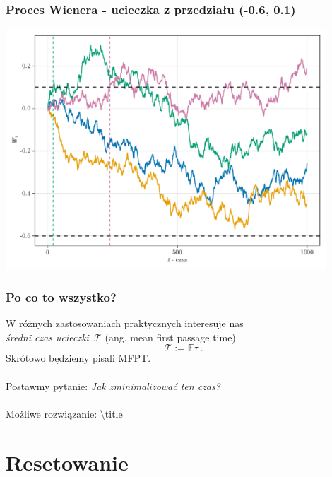 \documentclass{beamer}
\newcommand{\E}{\mathbb{E}}
\newcommand{\1}{\mathbb{1}}
\newcommand{\T}{\mathcal{T}}
\begin{document}
\begin{frame}
\frametitle{Proces Wienera - ucieczka z przedziału (-0.6, 0.1)}
\includegraphics[width=0.9\textwidth]{wiener-sim/tr-with-bounds.pdf}
\end{frame}

\begin{frame}
\frametitle{Po co to wszystko?}
W różnych zastosowaniach praktycznych interesuje nas \\ \emph{średni czas ucieczki}~$\T$ (ang. mean first passage time) 
\begin{equation}
\T := \E \tau~.
\end{equation}
Skrótowo będziemy pisali MFPT. \\~\\

\pause
Postawmy pytanie: \emph{Jak zminimalizować ten czas?} \\~\\
\pause
Możliwe rozwiązanie: \textbackslash title

\end{frame}





\section{Resetowanie}
\end{document}
